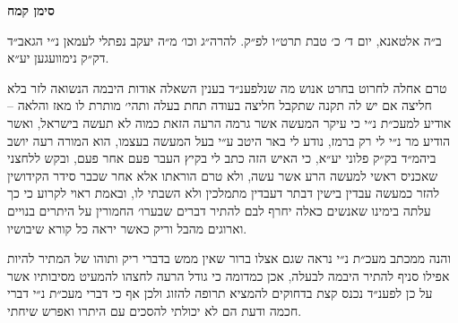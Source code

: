 \documentclass[12pt, openany]{book}
\newcommand{\chapname}{}
\newcommand{\newchap}[1]{
	\addcontentsline{toc}{chapter}{#1}
	\renewcommand{\chapname}{#1}
		\begin{center}
			\textbf{%
\fontsize{16pt}{16pt}\selectfont
				#1}
		\end{center}
}
\begin{document}
\newchap{סימן קמח}
\begin{multicols}{2}
ב״ה אלטאנא, יום ד׳ כ׳ טבת תרט״ו לפ״ק. להרה״ג וכו׳ מ״ה יעקב נפתלי לעמאן נ״י הגאב״ד דק״ק נימוועגען יע״א.\\\vspace{0pt}

טרם אחלה לחרוט בחרט אנוש מה שנלפענ״ד בענין השאלה אודות היבמה הנשואה לזר בלא חליצה אם יש לה תקנה שתקבל חליצה בעודה תחת בעלה ותהי׳ מותרת לו מאז והלאה – אודיע למעכ״ת נ״י כי עיקר המעשה אשר גרמה הרעה הזאת כמוה לא תעשה בישראל, ואשר הודיע מר נ״י לי רק ברמז, נודע לי באר היטב ע״י בעל המעשה בעצמו, הוא המורה רעה יושב ביהמ״ד בק״ק פלוני יע״א, כי האיש הזה כתב לי בקיץ העבר פעם אחר פעם, ובקש ללחצני שאכניס ראשי למעשה הרע אשר עשה, ולא טרם הוראתו אלא אחר שכבר סידר הקידושין להזר כמעשה עבדין בישין דבתר דעבדין מתמלכין ולא השבתי לו, ובאמת ראוי לקרוע כי כך עלתה בימינו שאנשים כאלה יחרף לבם להתיר דברים שבערו׳ החמורין על היתרים בנויים וארוגים מהבל וריק כאשר יראה כל קורא שיבושיו.\\\vspace{0pt}

והנה ממכתב מעכ״ת נ״י נראה שגם אצלו ברור שאין ממש בדברי ריק ותוהו של המתיר להיות אפילו סניף להתיר היבמה לבעלה, אכן כמדומה כי גודל הרעה לחצהו להמעיט מסיבותיו אשר על כן לפענ״ד נכנס קצת בדחוקים להמציא תרופה להזוג ולכן אף כי דברי מעכ״ת נ״י דברי חכמה ודעת הם לא יכולתי להסכים עם היתרו ואפרש שיחתי.\\\vspace{0pt}


\end{multicols}
\end{document}

